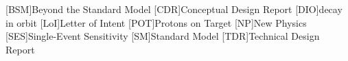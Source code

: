 \begin{acronym}
[BSM]{Beyond the Standard Model}
[CDR]{Conceptual Design Report}
[DIO]{decay in orbit}
[LoI]{Letter of Intent}
[POT]{Protons on Target}
[NP]{New Physics}
[SES]{Single-Event Sensitivity}
[SM]{Standard Model}
[TDR]{Technical Design Report}
\end{acronym}

